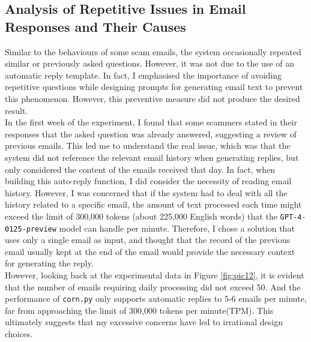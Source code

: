 \documentclass[ oneside,%
                    author={Cassie Qing Tang},
                    degree={BSc},
                     title={An Automated Response System for Disrupting Online Pet Scamming \\ },
                    subtitle={ }]{dissertation}
\begin{document}
\subsection{Analysis of Repetitive Issues in Email Responses and Their Causes}
\label{sec:4.2.3}
Similar to the behaviours of some scam emails, the system occasionally repeated similar or previously asked questions. However, it was not due to the use of an automatic reply template. In fact, I emphasised the importance of avoiding repetitive questions while designing prompts for generating email text to prevent this phenomenon. However, this preventive measure did not produce the desired result.
\\

In the first week of the experiment, I found that some scammers stated in their responses that the asked question was already answered, suggesting a review of previous emails. This led me to understand the real issue, which was that the system did not reference the relevant email history when generating replies, but only considered the content of the emails received that day. In fact, when building this auto-reply function, I did consider the necessity of reading email history. However, I was concerned that if the system had to deal with all the history related to a specific email, the amount of text processed each time might exceed the limit of 300,000 tokens (about 225,000 English words) that the \texttt{GPT-4-0125-preview} model can handle per minute. Therefore, I chose a solution that uses only a single email as input, and thought that the record of the previous email usually kept at the end of the email would provide the necessary context for generating the reply.
\\

However, looking back at the experimental data in Figure \ref{fig:pic12}, it is evident that the number of emails requiring daily processing did not exceed 50. And the performance of \texttt{corn.py} only supports automatic replies to 5-6 emails per minute, far from approaching the limit of 300,000 tokens per minute(TPM). This ultimately suggests that my excessive concerns have led to irrational design choices.
\end{document}
